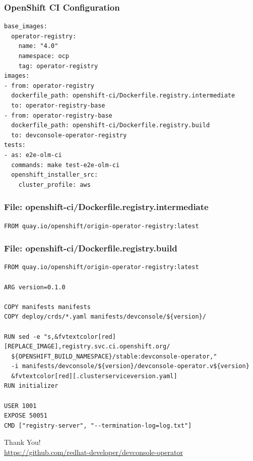 \documentclass[aspectratio=169]{beamer}
\begin{document}
\begin{frame}[fragile]
  \frametitle{OpenShift CI Configuration}

  \begin{Verbatim}[fontsize=\small]
base_images:
  operator-registry:
    name: "4.0"
    namespace: ocp
    tag: operator-registry
images:
- from: operator-registry
  dockerfile_path: openshift-ci/Dockerfile.registry.intermediate
  to: operator-registry-base
- from: operator-registry-base
  dockerfile_path: openshift-ci/Dockerfile.registry.build
  to: devconsole-operator-registry
tests:
- as: e2e-olm-ci
  commands: make test-e2e-olm-ci
  openshift_installer_src:
    cluster_profile: aws
  \end{Verbatim}
\end{frame}

\begin{frame}[fragile]
  \frametitle{File: openshift-ci/Dockerfile.registry.intermediate}

  \begin{Verbatim}[fontsize=\small]
FROM quay.io/openshift/origin-operator-registry:latest
  \end{Verbatim}
\end{frame}

\begin{frame}[fragile]
  \frametitle{File: openshift-ci/Dockerfile.registry.build}

  \begin{Verbatim}[fontsize=\small,commandchars=&\[\]]
FROM quay.io/openshift/origin-operator-registry:latest

ARG version=0.1.0

COPY manifests manifests
COPY deploy/crds/*.yaml manifests/devconsole/${version}/

RUN sed -e "s,&fvtextcolor[red][REPLACE_IMAGE],registry.svc.ci.openshift.org/
  ${OPENSHIFT_BUILD_NAMESPACE}/stable:devconsole-operator,"
  -i manifests/devconsole/${version}/devconsole-operator.v${version}
  &fvtextcolor[red][.clusterserviceversion.yaml]
RUN initializer

USER 1001
EXPOSE 50051
CMD ["registry-server", "--termination-log=log.txt"]
  \end{Verbatim}
\end{frame}

\begin{frame}
  \begin{center}
    {\huge Thank You!}\\[1cm]
    \url{https://github.com/redhat-developer/devconsole-operator}
  \end{center}
\end{frame}
\end{document}

